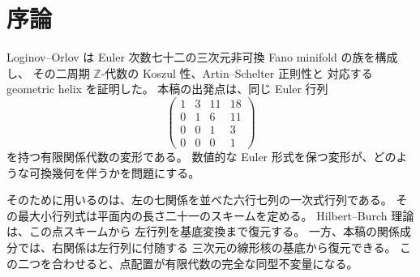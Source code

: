 \section{序論}
Loginov--Orlov は Euler 次数七十二の三次元非可換 Fano minifold の族を構成し、
その二周期 $\mathbb Z$-代数の Koszul 性、Artin--Schelter 正則性と
対応する geometric helix を証明した\cite{LO}。
本稿の出発点は、同じ Euler 行列
\begin{equation}\label{eq:euler}
 \begin{pmatrix}1&3&11&18\\0&1&6&11\\0&0&1&3\\0&0&0&1\end{pmatrix}
\end{equation}
を持つ有限関係代数の変形である。
数値的な Euler 形式を保つ変形が、どのような可換幾何を伴うかを問題にする。

そのために用いるのは、左の七関係を並べた六行七列の一次式行列である。
その最大小行列式は平面内の長さ二十一のスキームを定める。
Hilbert--Burch 理論\cite{EisenbudSidman,Eisenbud}は、この点スキームから
左行列を基底変換まで復元する。
一方、本稿の関係成分では、右関係は左行列に付随する
三次元の線形核の基底から復元できる。
この二つを合わせると、点配置が有限代数の完全な同型不変量になる。

